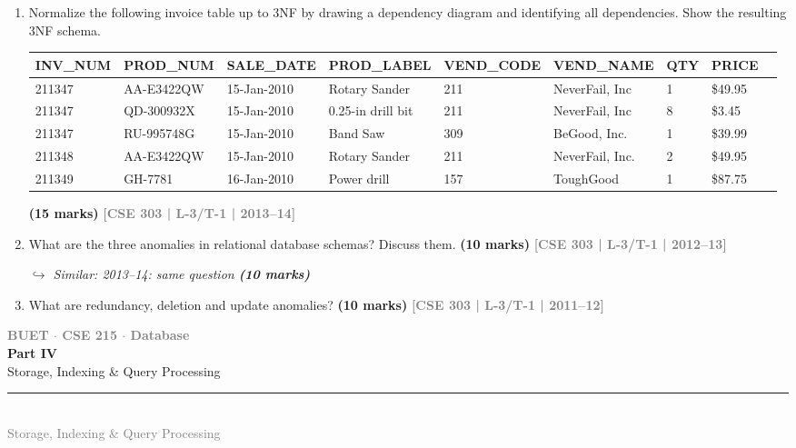 \documentclass[12pt,a3paper]{article}
\newcommand{\yr}[1]{\hfill\textcolor{gray}{\small\textbf{[#1]}}}
\newcommand{\mk}[1]{\textcolor{orange!70!black}{\small\textbf{(#1 marks)}}}
\newcommand{\variant}[1]{\par\vspace{1pt}\textcolor{blue!50!black}%
  {\footnotesize\textit{$\hookrightarrow$ Similar: #1}}}
\newcommand{\secdivider}[4]{%
  \newpage\thispagestyle{empty}%
  \vspace*{\fill}%
  \begin{tcolorbox}[enhanced,colback=#4!7,colframe=#3,boxrule=1.5pt,arc=8pt,
    left=20pt,right=20pt,top=22pt,bottom=22pt,
    shadow={3pt}{-3pt}{0pt}{black!15}]
    \centering
    {\large\textcolor{gray}{\textbf{BUET $\cdot$ CSE 215 $\cdot$ Database}}}\\[8pt]
    {\fontsize{26}{32}\selectfont\bfseries\textcolor{#3}{#1}}\\[6pt]
    {\fontsize{15}{19}\selectfont\textcolor{dgray}{#2}}\\[12pt]
    \textcolor{#3!60}{\rule{0.5\textwidth}{0.5pt}}\\[6pt]
    {\small\textcolor{gray}{#2}}
  \end{tcolorbox}%
  \vspace*{\fill}\newpage%
}
\begin{document}
\begin{enumerate}
\item Normalize the following invoice table up to 3NF by drawing a dependency diagram and identifying all dependencies. Show the resulting 3NF schema.

\medskip
\begin{center}
\small
\begin{tabular}{lllllllll}
\toprule
\textbf{INV\_NUM} & \textbf{PROD\_NUM} & \textbf{SALE\_DATE} & \textbf{PROD\_LABEL} & \textbf{VEND\_CODE} & \textbf{VEND\_NAME} & \textbf{QTY} & \textbf{PRICE}\\
\midrule
211347 & AA-E3422QW & 15-Jan-2010 & Rotary Sander & 211 & NeverFail, Inc & 1 & \$49.95\\
211347 & QD-300932X & 15-Jan-2010 & 0.25-in drill bit & 211 & NeverFail, Inc & 8 & \$3.45\\
211347 & RU-995748G & 15-Jan-2010 & Band Saw & 309 & BeGood, Inc. & 1 & \$39.99\\
211348 & AA-E3422QW & 15-Jan-2010 & Rotary Sander & 211 & NeverFail, Inc. & 2 & \$49.95\\
211349 & GH-7781 & 16-Jan-2010 & Power drill & 157 & ToughGood & 1 & \$87.75\\
\bottomrule
\end{tabular}
\end{center}
\mk{15} \yr{CSE 303 | L-3/T-1 | 2013--14}

\item What are the three anomalies in relational database schemas? Discuss them.
\mk{10} \yr{CSE 303 | L-3/T-1 | 2012--13}

\variant{2013--14: same question \mk{10}}

\item What are redundancy, deletion and update anomalies?
\mk{10} \yr{CSE 303 | L-3/T-1 | 2011--12}

\end{enumerate}


\secdivider{Part IV}{Storage, Indexing \& Query Processing}{cD}{cD}
\titleformat{\section}{\large\bfseries\color{cD}}{}{0em}{}[\titlerule]
\end{document}
